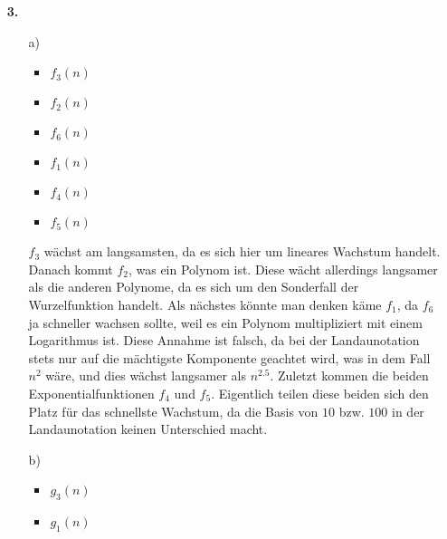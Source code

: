 \documentclass[a4paper,11pt]{article}
\begin{document}
\begin{enumerate}
            \item[\textbf{3.}]
                \begin{enumerate}
                    \item[a)]
                        \begin{itemize}
                            \item $f_3(n)$\\
                            \item $f_2(n)$\\
                            \item $f_6(n)$\\
                            \item $f_1(n)$\\
                            \item $f_4(n)$\\
                            \item $f_5(n)$\\
                        \end{itemize}
                        $f_3$ wächst am langsamsten, da es sich hier um lineares
                        Wachstum handelt. Danach kommt $f_2$, was ein Polynom ist.
                        Diese wächt allerdings langsamer als die anderen Polynome,
                        da es sich um den Sonderfall der Wurzelfunktion handelt.
                        Als nächstes könnte man denken käme $f_1$, da $f_6$ ja
                        schneller wachsen sollte, weil es ein Polynom multipliziert
                        mit einem Logarithmus ist. Diese Annahme ist falsch,
                        da bei der Landaunotation stets nur auf die mächtigste
                        Komponente geachtet wird, was in dem Fall $n^2$ wäre, und
                        dies wächst langsamer als $n^{2.5}$. Zuletzt kommen
                        die beiden Exponentialfunktionen $f_4$ und $f_5$.
                        Eigentlich teilen diese beiden sich den Platz für das
                        schnellste Wachstum, da die Basis von $10$ bzw. $100$
                        in der Landaunotation keinen Unterschied macht.
                    \item[b)]
                        \begin{itemize}
                            \item $g_3(n)$\\
                            \item $g_1(n)$\\

\end{itemize}
\end{enumerate}
\end{enumerate}
\end{document}
